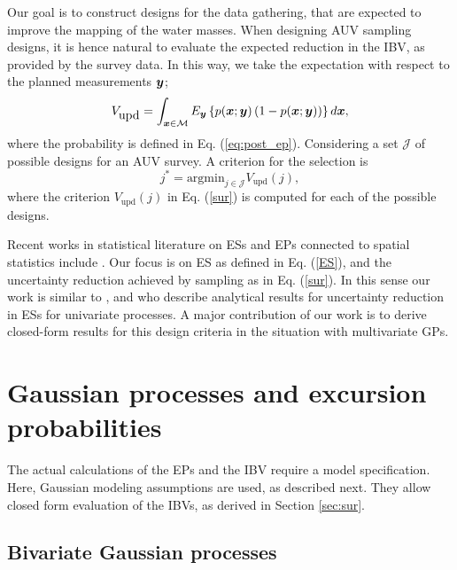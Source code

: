 \documentclass[aoas]{imsart}
\begin{document}
Our goal is to construct designs for the data gathering, that are expected to improve the mapping of the water masses. 
When designing AUV sampling designs, it is hence natural to evaluate the expected reduction in the IBV, as provided by the survey data. In this way, we take the expectation with respect to the planned measurements ${\boldsymbol y}$;
\begin{equation}\label{sur}
    V_{\mbox{upd}} = \int_{\bx \in \mathcal{M}} E_{\by} \left\{ p(\bx;\by)\left( 1-p(\bx;\by)\right) \right\} d\bx, 
\end{equation}
where the probability is defined in Eq. (\ref{eq:post_ep}).
Considering a set $\mathcal{J}$ of possible designs for an AUV survey. A criterion for the selection is
\begin{equation}\label{crit}
    j^* = \mbox{argmin}_{j \in \mathcal{J}} V_{\mbox{upd}}(j),
\end{equation}
where the criterion $V_{\mbox{upd}}(j)$ in Eq. (\ref{sur}) is computed for each of the possible designs. 

Recent works in statistical literature on ESs and EPs connected to
spatial statistics include
\cite{picheny2010,french2013spatio,bolin2015excursion,french2016credible}. Our focus
is on ES as defined in Eq. (\ref{ES}), and the
uncertainty reduction achieved by sampling as in Eq. (\ref{sur}).  In this sense
our work is similar to \cite{bect2012}, \cite{chevalier2014fast} and
\cite{azzimonti2016quantifying} who describe analytical results for
uncertainty reduction in ESs for univariate processes.  
A major contribution of our work is to derive closed-form results for this design criteria in the situation with multivariate GPs.

\section{Gaussian processes and excursion probabilities}
\label{sec:GP_EP}

The actual calculations of the EPs and the IBV require a model
specification. Here, Gaussian modeling assumptions are used, as described next. They allow closed form evaluation of the IBVs, as derived in Section \ref{sec:sur}.  

\subsection{Bivariate Gaussian processes}
\end{document}
